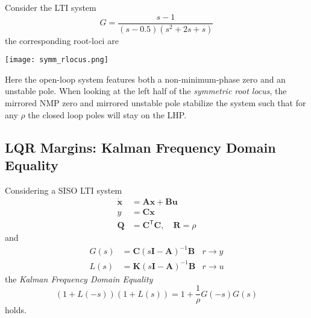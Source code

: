 \begin{examplesection}
    Consider the LTI system
    \noindent\begin{equation*}
        G = \frac{s-1}{(s-0.5)(s^2+2s+s)}
    \end{equation*}
    the corresponding root-loci are
    \begin{center}
        \texttt{[image: symm\_rlocus.png]}
    \end{center}
    Here the open-loop system features both a non-minimum-phase zero and an unstable pole.
    When looking at the left half of the \textit{symmetric root locus}, the mirrored NMP zero and mirrored unstable pole stabilize the system such that
    for any $\rho$ the closed loop poles will stay on the LHP.
\end{examplesection}

\subsection{LQR Margins: Kalman Frequency Domain Equality}
Considering a SISO LTI system
\noindent\begin{align*}
    \dot{\mathbf{x}} & = \mathbf{Ax} + \mathbf{Bu}                                 \\
    y                & = \mathbf{Cx}                                               \\
    \mathbf{Q}       & = \mathbf{C}^{\mathsf{T}} \mathbf{C}, \quad \mathbf{R}=\rho
\end{align*}
and
\noindent\begin{align*}
    G(s) & = \mathbf{C}{(s \mathbf{I}-\mathbf{A})}^{-1}\mathbf{B} & r\to y \\
    L(s) & = \mathbf{K}{(s \mathbf{I}-\mathbf{A})}^{-1}\mathbf{B} & r\to u
\end{align*}
the \textit{Kalman Frequency Domain Equality}
\noindent\begin{equation*}
    (1+L(-s))(1+L(s)) = 1+\frac{1}{\rho}G(-s)G(s)
\end{equation*}
holds.

